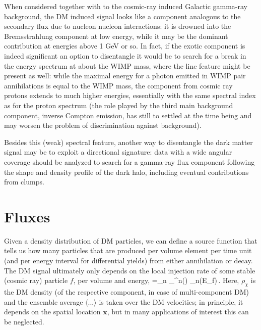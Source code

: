 When considered together with to the cosmic-ray induced Galactic gamma-ray
background, the DM induced signal looks like a component analogous
to the secondary flux due to nucleon nucleon interactions: it is
drowned into the Bremsstrahlung component at low energy, while it may 
be the dominant contribution at energies above 1 GeV or so. 
In fact, if the exotic component is indeed significant
an option to disentangle it would be to search for a break in the
energy spectrum at about the WIMP mass, where the line feature
might be present as well: while the maximal energy for a photon emitted 
in WIMP pair annihilations is equal to the WIMP mass,
the component from cosmic ray protons extends to much higher energies,
essentially with the same spectral index as for the proton spectrum
(the role played by the third main background component, 
inverse Compton emission, has still to settled at the time being and
may worsen the problem of discrimination against background).

Besides this (weak) spectral feature, another way to disentangle
the dark matter signal may be to exploit a directional signature:
data with a wide angular coverage should be analyzed to search for 
a gamma-ray flux component following the shape and density profile 
of the dark halo, including eventual contributions from clumps.


\section{Fluxes}

Given a density distribution of DM particles, we can define a source function that tells 
us how many particles that are produced per volume element per time unit (and per energy interval for differential yields) from either annihilation or decay. 
The DM signal ultimately only depends on the local 
injection rate of some stable (cosmic ray) particle $f$, per volume and energy,
\be
\label{psource}
=\sum_n \rho_\chi^n() 
\left\langle{}_n(E_f)\right\rangle\,.
\ee
Here, $\rho_\chi$ is the DM density (of the respective component, in case of multi-component DM) 
and the ensemble average $\langle ...\rangle$ is taken 
over the DM velocities; in principle, it  depends on the spatial location $\mathbf{x}$, but in many 
applications of interest this can be neglected. 

